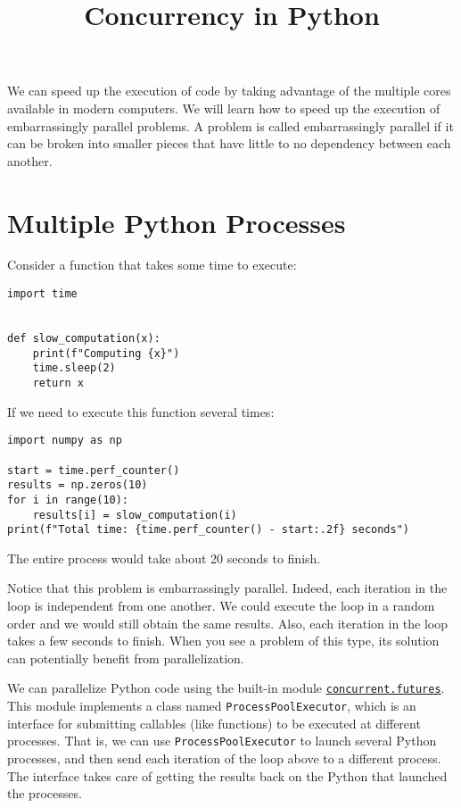 \documentclass[12pt, a4paper]{article}
\date{}
\title{Concurrency in Python}
\begin{document}
\maketitle
We can speed up the execution of code by taking advantage of the multiple cores available in modern computers.
We will learn how to speed up the execution of embarrassingly parallel problems.
A problem is called embarrassingly parallel if it can be broken into smaller pieces that have little to no dependency between each another.
\section{Multiple Python Processes}
\label{sec:orgcc7109e}
Consider a function that takes some time to execute:
\lstset{language=jupyter-python,label= ,caption= ,captionpos=b,numbers=none}
\begin{lstlisting}
import time


def slow_computation(x):
    print(f"Computing {x}")
    time.sleep(2)
    return x
\end{lstlisting}
If we need to execute this function several times:
\lstset{language=jupyter-python,label= ,caption= ,captionpos=b,numbers=none}
\begin{lstlisting}
import numpy as np

start = time.perf_counter()
results = np.zeros(10)
for i in range(10):
    results[i] = slow_computation(i)
print(f"Total time: {time.perf_counter() - start:.2f} seconds")
\end{lstlisting}
The entire process would take about 20 seconds to finish.

Notice that this problem is embarrassingly parallel.
Indeed, each iteration in the loop is independent from one another.
We could execute the loop in a random order and we would still obtain the same results.
Also, each iteration in the loop takes a few seconds to finish.
When you see a problem of this type, its solution can potentially benefit from parallelization.

We can parallelize Python code using the built-in module \href{https://docs.python.org/3/library/concurrent.futures.html}{\texttt{concurrent.futures}}.
This module implements a class named \texttt{ProcessPoolExecutor}, which is an interface for submitting callables (like functions) to be executed at different processes.
That is, we can use \texttt{ProcessPoolExecutor} to launch several Python processes, and then send each iteration of the loop above to a different process.
The interface takes care of getting the results back on the Python that launched the processes.
\end{document}
